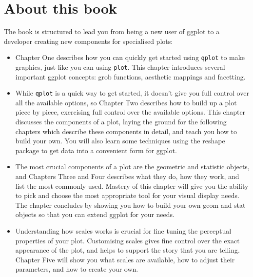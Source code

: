 \section{About this book}\label{sec:about_this_book}


The book is structured to lead you from being a new user of ggplot to a developer creating new components for specialised plots:

\begin{itemize}
	\item Chapter One describes how you can quickly get started using {\tt qplot} to make graphics, just like you can using {\tt plot}.  This chapter introduces several important ggplot concepts: grob functions, aesthetic mappings and facetting.
	
	\item While {\tt qplot} is a quick way to get started, it doesn't give you full control over all the  available options, so Chapter Two describes how to build up a plot piece by piece, exercising full control over the available options.  This chapter discusses the components of a plot, laying the ground for the following chapters which describe these components in detail, and teach you how to build your own.  You will also learn some techniques using the reshape package to get data into a convenient form for ggplot.

	\item The most crucial components of a plot are the geometric and statistic objects, and Chapters Three and Four describes what they do, how they work, and list the most commonly used.  Mastery of this chapter will give you the ability to pick and choose the most appropriate tool for your visual display needs.  The chapter concludes by showing you how to build your own geom and stat objects so that you can extend ggplot for your needs.

	\item Understanding how scales works is crucial for fine tuning the perceptual properties of your plot.  Customising scales gives fine control over the exact appearance of the plot, and helps to support the story that you are telling.  Chapter Five will show you what scales are available, how to adjust their parameters, and how to create your own.


\end{itemize}
